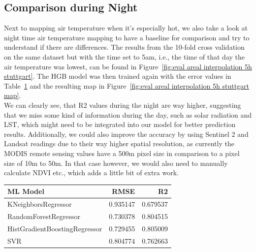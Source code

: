 \subsection{Comparison during Night}

Next to mapping air temperature when it's especially hot, we also take a look at night time air temperature mapping to have a baseline for comparison and try to understand if there are differences. The results from the 10-fold cross validation on the same dataset but with the time set to 5am, i.e., the time of that day the air temperature was lowest, can be found in Figure~\ref{fig:eval areal interpolation 5h stuttgart}. The HGB model was then trained again with the error values in Table~\ref{tab: eval night time 5h stuttgart} and the resulting map in Figure~\ref{fig:eval areal interpolation 5h stuttgart map}.\\
We can clearly see, that R2 values during the night are way higher, suggesting that we miss some kind of information during the day, such as solar radiation and LST, which might need to be integrated into our model for better prediction results. Additionally, we could also improve the accuracy by using Sentinel 2 and Landsat readings due to their way higher spatial resolution, as currently the MODIS remote sensing values have a 500m pixel size in comparison to a pixel size of 10m to 50m. In that case however, we would also need to manually calculate NDVI etc., which adds a little bit of extra work.

\begin{table}[ht]
  \centering
  \begin{tabular}{lrr}
  \toprule
                      ML Model &     RMSE &       R2 \\
  \midrule
            KNeighborsRegressor & 0.935147 & 0.679537 \\
          RandomForestRegressor & 0.730378 & 0.804515 \\
  HistGradientBoostingRegressor & 0.729455 & 0.805009 \\
                            SVR & 0.804774 & 0.762663 \\
  \bottomrule
  \end{tabular}
  \label{tab: eval night time 5h stuttgart}
\end{table}

